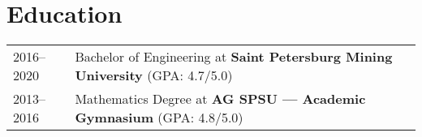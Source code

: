 \documentclass[a4paper,12pt]{article}
\begin{document}
\section{Education}\label{sec:education}
\begin{tabularx}{\linewidth}{@{}l X@{}}
  2016--2020 & Bachelor of Engineering at \textbf{Saint Petersburg Mining University} \hfill \normalsize (GPA: 4.7/5.0) \\
  2013--2016 & Mathematics Degree at \textbf{AG SPSU — Academic Gymnasium} \hfill (GPA: 4.8/5.0) \\
\end{tabularx}

\vfill
\end{document}
